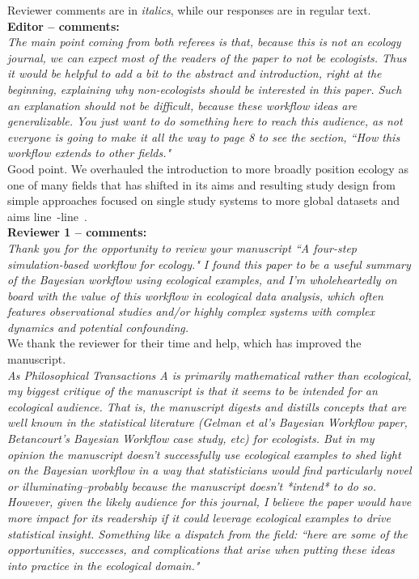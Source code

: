 \documentclass[11pt,a4paper]{article}
\newcommand{\lr}[1]{line~\lineref{#1}}
\begin{document}
%


Reviewer comments are in \emph{italics}, while our responses are in regular text. \\

{\bf Editor -- comments:} \\

\emph{The main point coming from both referees is that, because this is not an ecology journal, we can expect most of the readers of the paper to not be ecologists. Thus it would be helpful to add a bit to the abstract and introduction, right at the beginning, explaining why non-ecologists should be interested in this paper. Such an explanation should not be difficult, because these workflow ideas are generalizable. You just want to do something here to reach this audience, as not everyone is going to make it all the way to page 8 to see the section, ``How this workflow extends to other fields."}\\

Good point. We overhauled the introduction to more broadly position ecology as one of many fields that has shifted in its aims and resulting study design from simple approaches focused on single study systems to more global datasets and aims \lr{newintrostart}-\lr{newintroend}.\\

{\bf Reviewer 1 -- comments:} \\
\emph{Thank you for the opportunity to review your manuscript ``A four-step simulation-based workflow for ecology." I found this paper to be a useful summary of the Bayesian workflow using ecological examples, and I'm wholeheartedly on board with the value of this workflow in ecological data analysis, which often features observational studies and/or highly complex systems with complex dynamics and potential confounding.}\\

We thank the reviewer for their time and help, which has improved the manuscript. \\

\emph{As Philosophical Transactions A is primarily mathematical rather than ecological, my biggest critique of the manuscript is that it seems to be intended for an ecological audience. That is, the manuscript digests and distills concepts that are well known in the statistical literature (Gelman et al's Bayesian Workflow paper, Betancourt's Bayesian Workflow case study, etc) for ecologists. But in my opinion the manuscript doesn't successfully use ecological examples to shed light on the Bayesian workflow in a way that statisticians would find particularly novel or illuminating--probably because the manuscript doesn't *intend* to do so. However, given the likely audience for this journal, I believe the paper would have more impact for its readership if it could leverage ecological examples to drive statistical insight. Something like a dispatch from the field: ``here are some of the opportunities, successes, and complications that arise when putting these ideas into practice in the ecological domain."}\\
\end{document}
